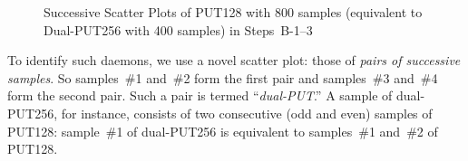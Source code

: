 \documentclass[letter]{ieice}
\begin{document}
\begin{figure}[h]
	\vspace{-0.3in} 
	\centering
	\vspace{-0.15in}
    \caption{Successive Scatter Plots of PUT128 with 800 samples 
    (equivalent to Dual-PUT256 with 400 samples) in {\color{blue}Steps~B-1--3}~\label{fig:put128_plot}} 
    \vspace{-0.25in}     
\end{figure} 

To identify such daemons, we use a novel \hbox{scatter} plot: 
those of {\em pairs of successive samples}. 
So samples~\#{1} and~\#{2} form the first pair and samples~\#{3} and~\#{4} 
form the second pair.
Such a pair is termed ``\hbox{{\it dual-PUT}}.'' 
A sample of \hbox{dual-PUT256}, for instance, 
consists of two consecutive (odd and even) 
samples of PUT128: 
sample~\#{1} of dual-PUT256 is equivalent 
to samples~\#{1} and~\#{2} of PUT128.
\end{document}

